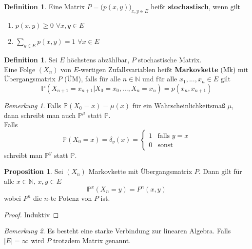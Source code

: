 \documentclass[10pt,a4paper]{article}
\newcommand{\N}{\ensuremath{\mathbb{N}}}
\newcommand{\Prb}{\mathbb P}
\theoremstyle{plain}
\theoremstyle{definition}
\newtheorem{definition}[theorem]{Definition}
\newtheorem{prop}[theorem]{Proposition}
\theoremstyle{remark}
\newtheorem*{bem*}{Bemerkung}
\begin{document}
	\begin{definition}
		Eine Matrix $P=\big(p(x,y)\big)_{x,y\in E}$ heißt \textbf{stochastisch}, wenn gilt
		\begin{enumerate}[label=(\roman*)]
			\item $p(x,y)\geq 0$ $\forall x,y\in E$
			\item $\sum_{y\in E}p(x,y)=1$ $\forall x\in E$
		\end{enumerate}
	\end{definition}

	\begin{definition}
		Sei $E$ höchstens abzählbar, $P$ stochastische Matrix.\\
		Eine Folge $(X_n)$ von $E$-wertigen Zufallsvariablen heißt \textbf{Markovkette} (Mk) mit Übergangsmatrix $P$ (ÜM), falls für alle $n\in\N$ und für alle $x_1,...,x_n\in E$ gilt
		\[\Prb\left(X_{n+1}=x_{n+1}\vert X_0=x_0,...,X_n=x_n\right)=p(x_n,x_{n+1})\]
	\end{definition}
	
	\begin{bem*}
		Falls $\Prb(X_0=x)=\mu(x)$ für ein Wahrscheinlichkeitsmaß $\mu$, dann schreibt man auch $\Prb^\mu$ statt $\Prb$.\\ Falls
		\[\Prb(X_0=x)=\delta_y(x)=\begin{cases}
		1&\text{falls }y=x\\
		0&\text{sonst}
		\end{cases}\]
		schreibt man $\Prb^y$ statt $\Prb$.
	\end{bem*}

	\begin{prop}\label{0704prop}
		Sei $(X_n)$ Markovkette mit Übergangsmatrix $P$. Dann gilt für alle $x\in\N$, $x,y\in E$
		\[\Prb^x(X_n=y)=P^n(x,y)\]
		wobei $P^n$ die $n$-te Potenz von $P$ ist. 
	\end{prop}
	\begin{proof}
		Induktiv
	\end{proof}

	\begin{bem*}
		Es besteht eine starke Verbindung zur linearen Algebra. Falls $|E|=\infty$ wird $P$ trotzdem Matrix genannt.
	\end{bem*}
\end{document}
